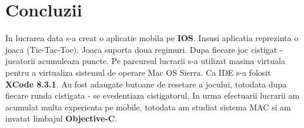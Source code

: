 \documentclass[12pt]{article}
\newcommand\tab[1][1cm]{\hspace*{#1}}
\begin{document}

\cleardoublepage


\cleardoublepage

\newpage
\section*{Concluzii}

\tab In lucrarea data s-a creat o aplicatie mobila pe \textbf{IOS}.
Insusi aplicatia reprezinta o joaca (Tic-Tac-Toe). Joaca suporta doua regimuri.
Dupa fiecare joc cistigat - jucatorii acumuleaza puncte. Pe parcursul lucrarii s-a utilizat
masina virtuala pentru a virtualiza sistemul de operare Mac OS Sierra. Ca IDE s-a folosit
\textbf{XCode 8.3.1}. Au fost adaugate butoane de resetare a jocului, totodata dupa fiecare runda
cistigata - se evedentiaza cistigatorul. In urma efectuarii lucrarii am acumulat multa experienta pe
mobile, totodata am studiat sistema MAC si am invatat limbajul \textbf{Objective-C}.
\end{document}
